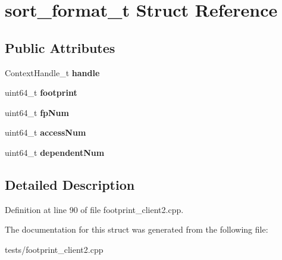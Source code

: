 \hypertarget{structsort__format__t}{\section{sort\-\_\-format\-\_\-t Struct Reference}
\label{structsort__format__t}
}
\subsection*{Public Attributes}
\begin{DoxyCompactItemize}
\item 
\hypertarget{structsort__format__t_aedf7f4a763b64352031a297795312fc3}{Context\-Handle\-\_\-t {\bfseries handle}}\label{structsort__format__t_aedf7f4a763b64352031a297795312fc3}

\item 
\hypertarget{structsort__format__t_a9f3f819a8cc8ddc5723de7487e90c8e2}{uint64\-\_\-t {\bfseries footprint}}\label{structsort__format__t_a9f3f819a8cc8ddc5723de7487e90c8e2}

\item 
\hypertarget{structsort__format__t_ad44b1870e9efacb82187442195153ed9}{uint64\-\_\-t {\bfseries fp\-Num}}\label{structsort__format__t_ad44b1870e9efacb82187442195153ed9}

\item 
\hypertarget{structsort__format__t_a8ab578ea53fb8e842aa881d960da9367}{uint64\-\_\-t {\bfseries access\-Num}}\label{structsort__format__t_a8ab578ea53fb8e842aa881d960da9367}

\item 
\hypertarget{structsort__format__t_a8af202c4479b7bfea9b92128058a737c}{uint64\-\_\-t {\bfseries dependent\-Num}}\label{structsort__format__t_a8af202c4479b7bfea9b92128058a737c}

\end{DoxyCompactItemize}


\subsection{Detailed Description}


Definition at line 90 of file footprint\-\_\-client2.\-cpp.



The documentation for this struct was generated from the following file\-:\begin{DoxyCompactItemize}
\item 
tests/footprint\-\_\-client2.\-cpp\end{DoxyCompactItemize}
